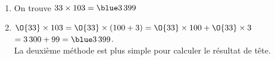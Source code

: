    \ \\ [-5mm]
   \begin{enumerate}
      \item On trouve $33\times103 =\blue 3\,399$
      \item $\O{33}\times103 =\O{33}\times(100+3) =\O{33}\times100+\O{33}\times3$ \\
         \hspace*{18mm} $=3\,300+99 =\blue 3\,399$. \\
{\blue La deuxième méthode est plus simple pour calculer le résultat de tête}.
   \end{enumerate}

